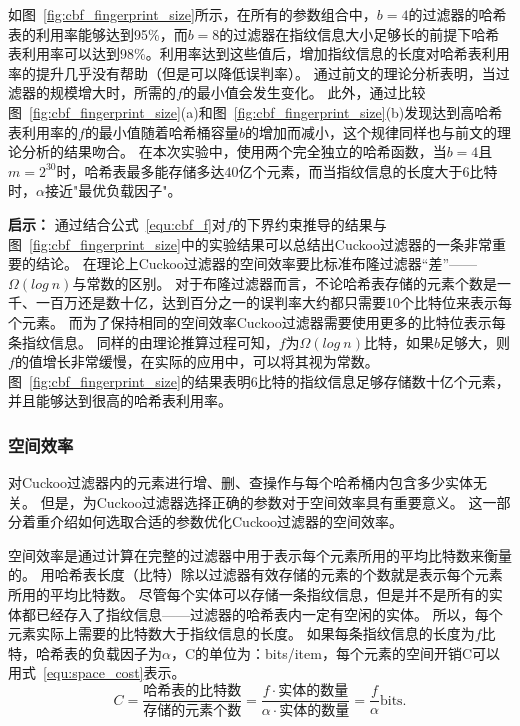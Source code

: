 如图~\ref{fig:cbf_fingerprint_size}所示，在所有的参数组合中，$b = 4$的过滤器的哈希表的利用率能够达到95\%，而$b = 8$的过滤器在指纹信息大小足够长的前提下哈希表利用率可以达到98\%。利用率达到这些值后，增加指纹信息的长度对哈希表利用率的提升几乎没有帮助（但是可以降低误判率）。
通过前文的理论分析表明，当过滤器的规模增大时，所需的$f$的最小值会发生变化。
此外，通过比较图~\ref{fig:cbf_fingerprint_size}(a)和图~\ref{fig:cbf_fingerprint_size}(b)发现达到高哈希表利用率的$f$的最小值随着哈希桶容量$b$的增加而减小，这个规律同样也与前文的理论分析的结果吻合。
在本次实验中，使用两个完全独立的哈希函数，当$b = 4$且$m = 2^{30}$时，哈希表最多能存储多达40亿个元素，而当指纹信息的长度大于6比特时，$\alpha$接近"最优负载因子"。

\textbf{启示：}
通过结合公式~\ref{equ:cbf_f}对$f$的下界约束推导的结果与图~\ref{fig:cbf_fingerprint_size}中的实验结果可以总结出Cuckoo过滤器的一条非常重要的结论。
在理论上Cuckoo过滤器的空间效率要比标准布隆过滤器“差”——
$\Omega(log~n)$与常数的区别。
对于布隆过滤器而言，不论哈希表存储的元素个数是一千、一百万还是数十亿，达到百分之一的误判率大约都只需要10个比特位来表示每个元素。
而为了保持相同的空间效率Cuckoo过滤器需要使用更多的比特位表示每条指纹信息。
同样的由理论推算过程可知，$f$为$\Omega(log~n)$比特，如果$b$足够大，则$f$的值增长非常缓慢，在实际的应用中，可以将其视为常数。
图~\ref{fig:cbf_fingerprint_size}的结果表明6比特的指纹信息足够存储数十亿个元素，并且能够达到很高的哈希表利用率。

\subsubsection{空间效率}
\label{sec:space_ef}
对Cuckoo过滤器内的元素进行增、删、查操作与每个哈希桶内包含多少实体无关。
但是，为Cuckoo过滤器选择正确的参数对于空间效率具有重要意义。
这一部分着重介绍如何选取合适的参数优化Cuckoo过滤器的空间效率。

空间效率是通过计算在完整的过滤器中用于表示每个元素所用的平均比特数来衡量的。
用哈希表长度（比特）除以过滤器有效存储的元素的个数就是表示每个元素所用的平均比特数。
尽管每个实体可以存储一条指纹信息，但是并不是所有的实体都已经存入了指纹信息——过滤器的哈希表内一定有空闲的实体。
所以，每个元素实际上需要的比特数大于指纹信息的长度。
如果每条指纹信息的长度为$f$比特，哈希表的负载因子为$\alpha$，C的单位为：bits/item，每个元素的空间开销C可以用式~\ref{equ:space_cost}表示。
\begin{equation}
C = \frac{\text{哈希表的比特数}}{\text{存储的元素个数}} = \frac{f\cdot \text{实体的数量}}{\alpha \cdot \text{实体的数量}} = \frac{f}{\alpha} \text{bits.}
\label{equ:space_cost}
\end{equation}

